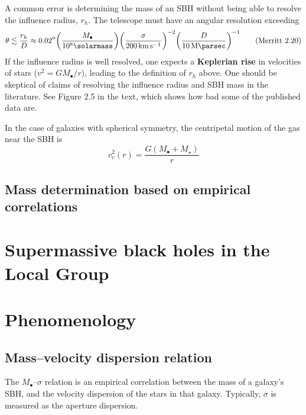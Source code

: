 \documentclass[degn-notes.tex]{subfiles}
\begin{document}
A common error is determining the mass of an SBH without being able to resolve the influence radius, $r_h$. The telescope must have an angular resolution exceeding
%
\begin{displaymath}
  \theta \lesssim
  \frac{r_h}{D} \approx
  0.02'' \qty(\frac{M_\bullet}{10^8 \si{\solarmass}})
         \qty(\frac{\sigma}{\SI{200}{\kilo\meter\per\second}})^{-2}
         \qty(\frac{D}{\SI{10}{\mega\parsec}})^{-1}
%
  \tag{Merritt 2.20}
  \label{merritt:2.20}
\end{displaymath}
%
If the influence radius is well resolved, one expects a \textbf{Keplerian rise} in velocities of stars ($v^2 = G M_\bullet / r$), leading to the definition of $r_h$ above. One should be skeptical of claims of resolving the influence radius and SBH mass in the literature. See Figure 2.5 in the text, which shows how bad some of the published data are.

In the case of galaxies with spherical symmetry, the centripetal motion of the gas near the SBH is
%
\begin{displaymath}
  v_c^2(r) = \frac{G (M_\bullet + M_\star)}{r}
%
  \tag{Merritt 2.22}
  \label{merritt:2.22}
\end{displaymath}


\setcounter{subsection}{2}
\subsection{Mass determination based on empirical correlations}





\section{Supermassive black holes in the Local Group}

\section{Phenomenology}

\setcounter{subsection}{1}
\subsection{Mass--velocity dispersion relation}

The $M_\bullet$--$\sigma$ relation is an empirical correlation between the mass of a galaxy's SBH, and the velocity dispersion of the stars in that galaxy. Typically, $\sigma$ is measured as the aperture dispersion.
\end{document}
